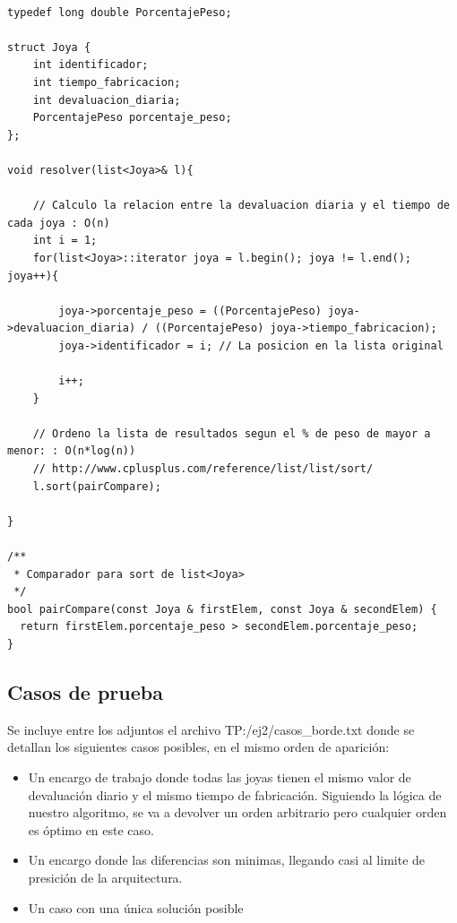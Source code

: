 \begin{lstlisting}
               
typedef long double PorcentajePeso;

struct Joya {
	int identificador;
	int tiempo_fabricacion;
	int devaluacion_diaria;
	PorcentajePeso porcentaje_peso;
};

void resolver(list<Joya>& l){
	
	// Calculo la relacion entre la devaluacion diaria y el tiempo de cada joya : O(n)
	int i = 1;
	for(list<Joya>::iterator joya = l.begin(); joya != l.end(); joya++){
		
		joya->porcentaje_peso = ((PorcentajePeso) joya->devaluacion_diaria) / ((PorcentajePeso) joya->tiempo_fabricacion);
		joya->identificador = i; // La posicion en la lista original
		
		i++;
	}
	
	// Ordeno la lista de resultados segun el % de peso de mayor a menor: : O(n*log(n)) 
	// http://www.cplusplus.com/reference/list/list/sort/
	l.sort(pairCompare);

}

/**
 * Comparador para sort de list<Joya>
 */
bool pairCompare(const Joya & firstElem, const Joya & secondElem) {
  return firstElem.porcentaje_peso > secondElem.porcentaje_peso;
}
\end{lstlisting}

\subsection{Casos de prueba}

Se incluye entre los adjuntos el archivo TP:/ej2/casos\_borde.txt donde se detallan los siguientes casos posibles, en el mismo orden de aparici\'on:

\begin{itemize}
\item Un encargo de trabajo donde todas las joyas tienen el mismo valor de devaluaci\'on diario y el mismo tiempo de fabricaci\'on. Siguiendo la l\'ogica de nuestro algoritmo, se va a devolver un orden arbitrario pero cualquier orden es \'optimo en este caso.
\item Un encargo donde las diferencias son minimas, llegando casi al limite de presici\'on de la arquitectura.
\item Un caso con una \'unica soluci\'on posible
\end{itemize}

